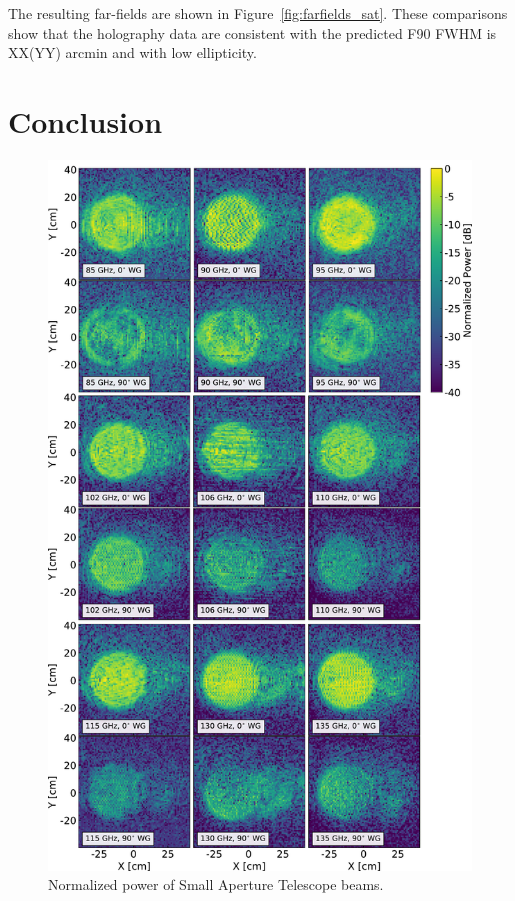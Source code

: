 The resulting far-fields are shown in Figure~\ref{fig:farfields_sat}.  These comparisons show that the holography data are consistent with the predicted F90 FWHM is XX(YY) arcmin and with low ellipticity.


\section{Conclusion}
\label{sec:sat_discussion}
\begin{figure}
    \centering
    \includegraphics[width=.75\textwidth]{Figures/sat_beams.pdf}
    \caption{Normalized power of Small Aperture Telescope beams.}
    \label{fig:sat_beams}
\end{figure}

